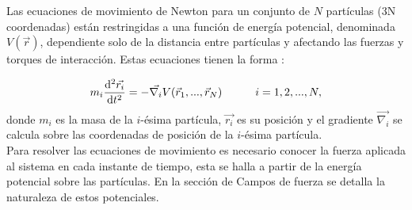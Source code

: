 Las ecuaciones de movimiento de Newton para un conjunto de $N$ part\'{i}culas (3N coordenadas) est\'{a}n restringidas a una funci\'{o}n de energ\'{i}a potencial, denominada $V(\vec{r})$, dependiente solo de la distancia entre part\'{i}culas y afectando las fuerzas y torques de interacci\'{o}n. Estas ecuaciones tienen la forma \cite{Goldstein2001}:

\begin{equation}\label{eq:1}
m_i\frac{\mathrm{d}^2\vec{r_i}}{\mathrm{d}t^2}=-\vec{\nabla_i}V(\vec{r}_1,...,\vec{r}_N) \text{\hspace{30pt}}i=1,2,...,N,
\end{equation}
donde $m_i$ es la masa de la $i$-\'{e}sima part\'{i}cula, $\vec{r_i}$ es su posici\'{o}n y el gradiente $ \vec{\nabla_i}$ se calcula sobre las coordenadas de posici\'{o}n de la $i$-\'{e}sima part\'{i}cula.\\

Para resolver las ecuaciones de movimiento es necesario conocer la fuerza aplicada al sistema en cada instante de tiempo, esta se halla a partir de la energ\'{i}a potencial sobre las part\'{i}culas. En la secci\'{o}n de Campos de fuerza se detalla la naturaleza de estos potenciales.
